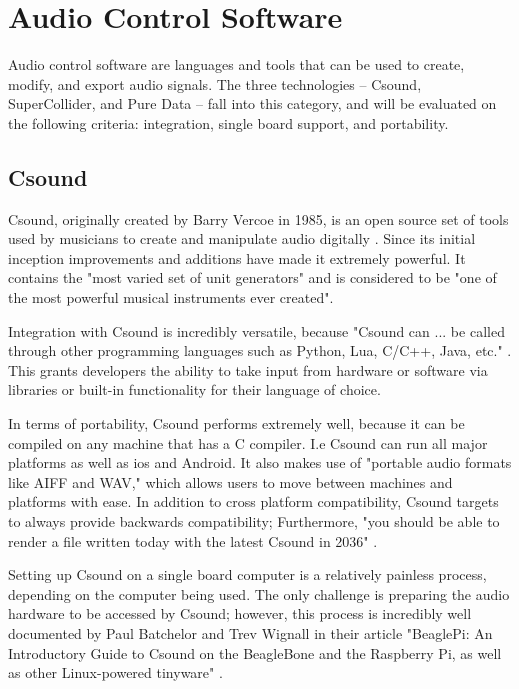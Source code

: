 \section{Audio Control Software}
    Audio control software are languages and tools that can be used to create, modify, and export audio signals.
    The three technologies -- Csound, SuperCollider, and Pure Data -- fall into this category, and will be evaluated on the following criteria: integration, single board support, and portability. 
    
    \subsection{Csound}
        Csound, originally created by Barry Vercoe in 1985, is an open source set of tools used by musicians to create and manipulate audio digitally \cite{bib:cSoundHome}. Since its initial inception improvements and additions have made it extremely powerful. It contains the "most varied set of unit generators" and is considered to be "one of the most powerful musical instruments ever created"\cite{bib:cSoundMan}.
        
        Integration with Csound is incredibly versatile, because "Csound can ... be called through other programming languages such as Python, Lua, C/C++, Java, etc." \cite{bib:cSoundHome}.
        This grants developers the ability to take input from hardware or software via libraries or built-in functionality for their language of choice.
        
        
        In terms of portability, Csound performs extremely well, because it can be compiled on any machine that has a C compiler. I.e Csound can run all major platforms as well as ios and Android.
        It also makes use of "portable audio formats like AIFF and WAV," which allows users to move between machines and platforms with ease\cite{bib:cSoundMan}.
        In addition to cross platform compatibility, Csound targets to always provide backwards compatibility; Furthermore, "you should be able to render a file written today with the latest Csound in 2036" \cite{bib:cSoundHome}.
        
        Setting up Csound on a single board computer is a relatively painless process, depending on the computer being used.
        The only challenge is preparing the audio hardware to be accessed by Csound; however, this process is incredibly well documented by Paul Batchelor and Trev Wignall in their article "BeaglePi: An Introductory Guide to Csound on the BeagleBone and the Raspberry Pi, as well as other Linux-powered tinyware" \cite{bib:csoundJ}.
        
